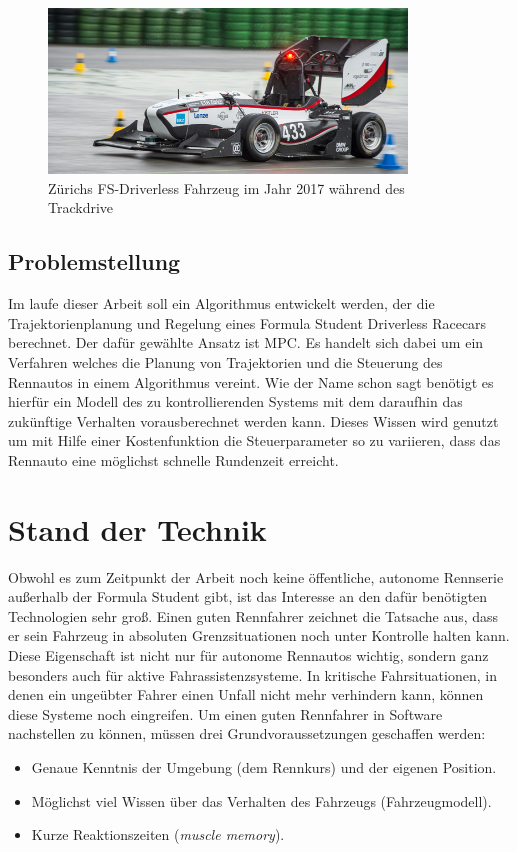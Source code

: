 \documentclass{like}
\begin{document}
\begin{figure}[hb!]
	\centering
	\includegraphics[width=270pt]{Abbildungen/amz-driverless-long.jpg}
	\caption{Zürichs FS-Driverless Fahrzeug im Jahr 2017 während des Trackdrive}
\end{figure}

\section{Problemstellung}
Im laufe dieser Arbeit soll ein Algorithmus entwickelt werden, der die Trajektorienplanung und Regelung eines Formula Student Driverless Racecars berechnet. Der dafür gewählte Ansatz ist \acl{MPC}. Es handelt sich dabei um ein Verfahren welches die Planung von Trajektorien und die Steuerung des Rennautos in einem Algorithmus vereint. Wie der Name schon sagt benötigt es hierfür ein Modell des zu kontrollierenden Systems mit dem daraufhin das zukünftige Verhalten vorausberechnet werden kann. Dieses Wissen wird genutzt um mit Hilfe einer Kostenfunktion die Steuerparameter so zu variieren, dass das Rennauto eine möglichst schnelle Rundenzeit erreicht.

\chapter{Stand der Technik}
Obwohl es zum Zeitpunkt der Arbeit noch keine öffentliche, autonome Rennserie außerhalb der Formula Student gibt, ist das Interesse an den dafür benötigten Technologien sehr groß.
Einen guten Rennfahrer zeichnet die Tatsache aus, dass er sein Fahrzeug in absoluten Grenzsituationen noch unter Kontrolle halten kann. Diese Eigenschaft ist nicht nur für autonome Rennautos wichtig, sondern ganz besonders auch für aktive Fahrassistenzsysteme. In kritische Fahrsituationen, in denen ein ungeübter Fahrer einen Unfall nicht mehr verhindern kann, können diese Systeme noch eingreifen. Um einen guten Rennfahrer in Software nachstellen zu können, müssen drei Grundvoraussetzungen geschaffen werden:
\begin{itemize}
	\item Genaue Kenntnis der Umgebung (dem Rennkurs) und der eigenen Position.
	\item Möglichst viel Wissen über das Verhalten des Fahrzeugs (Fahrzeugmodell).
	\item Kurze Reaktionszeiten (\emph{muscle memory}).
\end{itemize}
\end{document}
